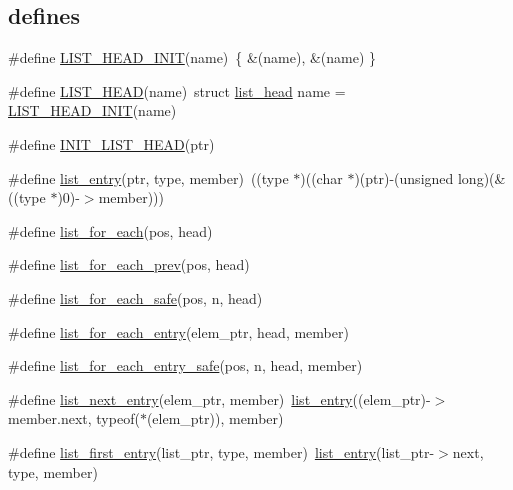 \subsection*{\textquotesingle{}defines\textquotesingle{}}
\begin{DoxyCompactItemize}
\item 
\#define \hyperlink{G-2313-06-P1__list_8h_a4642d4b7df28478bb762fe43c85b5c63}{L\+I\+S\+T\+\_\+\+H\+E\+A\+D\+\_\+\+I\+N\+IT}(name)~\{ \&(name), \&(name) \}
\item 
\#define \hyperlink{G-2313-06-P1__list_8h_a42f0e72af970a790b60a740af8c9ecd0}{L\+I\+S\+T\+\_\+\+H\+E\+AD}(name)~struct \hyperlink{structlist__head}{list\+\_\+head} name = \hyperlink{G-2313-06-P1__list_8h_a4642d4b7df28478bb762fe43c85b5c63}{L\+I\+S\+T\+\_\+\+H\+E\+A\+D\+\_\+\+I\+N\+IT}(name)
\item 
\#define \hyperlink{G-2313-06-P1__list_8h_a0ffe9d28c36d7b018a9cfae33bae45c0}{I\+N\+I\+T\+\_\+\+L\+I\+S\+T\+\_\+\+H\+E\+AD}(ptr)
\item 
\#define \hyperlink{G-2313-06-P1__list_8h_a26c976b7f654e70df318c1843e5094de}{list\+\_\+entry}(ptr,  type,  member)~((type $\ast$)((char $\ast$)(ptr)-\/(unsigned long)(\&((type $\ast$)0)-\/$>$member)))
\item 
\#define \hyperlink{G-2313-06-P1__list_8h_ab8b24e6660ab3760c923e4b4db3fa502}{list\+\_\+for\+\_\+each}(pos,  head)
\item 
\#define \hyperlink{G-2313-06-P1__list_8h_a19fc06b83f3502a83ce566b8887e6aec}{list\+\_\+for\+\_\+each\+\_\+prev}(pos,  head)
\item 
\#define \hyperlink{G-2313-06-P1__list_8h_a9e4b9328744994b9d3878f5dad75c09f}{list\+\_\+for\+\_\+each\+\_\+safe}(pos,  n,  head)
\item 
\#define \hyperlink{G-2313-06-P1__list_8h_aa728613529c4fc5383f80b3d733b4153}{list\+\_\+for\+\_\+each\+\_\+entry}(elem\+\_\+ptr,  head,  member)
\item 
\#define \hyperlink{G-2313-06-P1__list_8h_ac3f72d6bd5144c7970824813810d2da1}{list\+\_\+for\+\_\+each\+\_\+entry\+\_\+safe}(pos,  n,  head,  member)
\item 
\#define \hyperlink{G-2313-06-P1__list_8h_a853740b546497b17a28faf076cf3f6a0}{list\+\_\+next\+\_\+entry}(elem\+\_\+ptr,  member)~\hyperlink{G-2313-06-P1__list_8h_a26c976b7f654e70df318c1843e5094de}{list\+\_\+entry}((elem\+\_\+ptr)-\/$>$member.\+next, typeof($\ast$(elem\+\_\+ptr)), member)
\item 
\#define \hyperlink{G-2313-06-P1__list_8h_a894172f609f0f81a2d6ffdcd7ac1954f}{list\+\_\+first\+\_\+entry}(list\+\_\+ptr,  type,  member)~\hyperlink{G-2313-06-P1__list_8h_a26c976b7f654e70df318c1843e5094de}{list\+\_\+entry}(list\+\_\+ptr-\/$>$next, type, member)
\end{DoxyCompactItemize}



